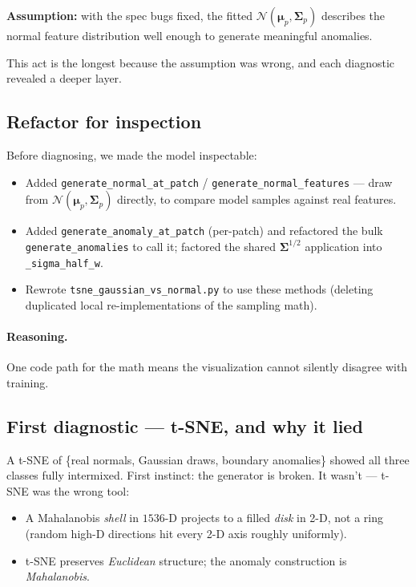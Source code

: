 \documentclass[11pt]{article}
\newcommand{\code}[1]{\texttt{#1}}
\newcommand{\bmu}{\boldsymbol{\mu}}
\newcommand{\bSigma}{\boldsymbol{\Sigma}}
\begin{document}
\textbf{Assumption:} with the spec bugs fixed, the fitted
$\mathcal{N}(\bmu_p, \bSigma_p)$ describes the normal feature distribution well
enough to generate meaningful anomalies.

\medskip
\noindent
This act is the longest because the assumption was wrong, and each diagnostic
revealed a deeper layer.

\subsection{Refactor for inspection}

Before diagnosing, we made the model inspectable:
\begin{itemize}[noitemsep]
  \item Added \code{generate\_normal\_at\_patch} / \code{generate\_normal\_features}
    --- draw from $\mathcal{N}(\bmu_p, \bSigma_p)$ directly, to compare model
    samples against real features.
  \item Added \code{generate\_anomaly\_at\_patch} (per-patch) and refactored the
    bulk \code{generate\_anomalies} to call it; factored the shared
    $\bSigma^{1/2}$ application into \code{\_sigma\_half\_w}.
  \item Rewrote \code{tsne\_gaussian\_vs\_normal.py} to use these methods
    (deleting duplicated local re-implementations of the sampling math).
\end{itemize}

\paragraph{Reasoning.}
One code path for the math means the visualization cannot silently disagree with
training.

\subsection{First diagnostic --- t-SNE, and why it lied}

A t-SNE of \{real normals, Gaussian draws, boundary anomalies\} showed all three
classes fully intermixed. First instinct: the generator is broken. It wasn't ---
t-SNE was the wrong tool:
\begin{itemize}[noitemsep]
  \item A Mahalanobis \emph{shell} in $1536$-D projects to a filled \emph{disk} in
    2-D, not a ring (random high-D directions hit every 2-D axis roughly
    uniformly).
  \item t-SNE preserves \emph{Euclidean} structure; the anomaly construction is
    \emph{Mahalanobis}.
\end{itemize}
\end{document}
